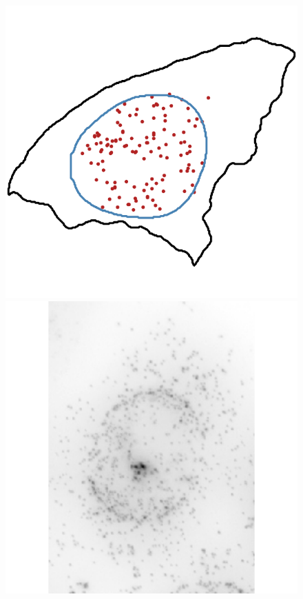 \begin{figure}[]
		\includegraphics[width=0.95\linewidth]{figures/introduction/real_coord_intranuclear}
	\endminipage\hfill
		\includegraphics[width=0.95\linewidth]{figures/introduction/real_image_nuclear_edge}
		\vfill

\end{figure}
